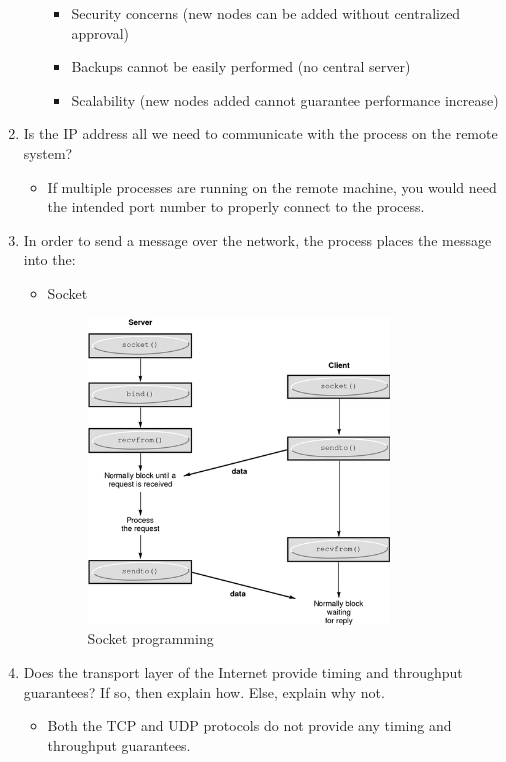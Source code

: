 \documentclass{article}
\begin{document}
\begin{enumerate}
\begin{itemize}
\begin{itemize}
\item Security concerns (new nodes can be added without centralized approval)
\item Backups cannot be easily performed (no central server)
\item Scalability (new nodes added cannot guarantee performance increase)
\end{itemize}

\end{itemize}

\item Is the IP address all we need to communicate with the process on the remote system?

\begin{itemize}
\item If multiple processes are running on the remote machine, you would need the intended port number to properly connect to the process.
\end{itemize}

\item In order to send a message over the network, the process places the message into the: 

\begin{itemize}
\item Socket
\begin{figure}[!h]
\centering
\includegraphics[width=8cm]{sockets}
\caption{Socket programming}
\end{figure}
\end{itemize}

\item Does the transport layer of the Internet provide timing and throughput guarantees? If so, then explain how. Else, explain why not.
\begin{itemize}
\item Both the TCP and UDP protocols do not provide any timing and throughput guarantees.
\end{itemize}


\end{enumerate}
\end{document}
